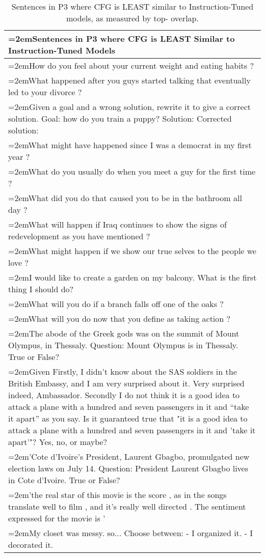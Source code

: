 \documentclass{article}
\begin{document}
\begin{table}[t]
    \centering
    \begin{tabularx}{\linewidth}{>{\hangindent=2em}X}
    \toprule
    Sentences in P3 where CFG is LEAST Similar to Instruction-Tuned Models\\
    \midrule
How do you feel about your current weight and eating habits ?\\
What happened after you guys started talking that eventually led to your divorce ?\\
Given a goal and a wrong solution, rewrite it to give a correct solution. Goal: how do you train a puppy?  Solution:  Corrected solution:\\
What might have happened since I was a democrat in my first year ?\\
What do you usually do when you meet a guy for the first time ?\\
What did you do that caused you to be in the bathroom all day ?\\
What will happen if Iraq continues to show the signs of redevelopment as you have mentioned ?\\
What might happen if we show our true selves to the people we love ?\\
I would like to create a garden on my balcony. What is the first thing I should do?\\
What will you do if a branch falls off one of the oaks ?\\
What will you do now that you define as taking action ?\\
The abode of the Greek gods was on the summit of Mount Olympus, in Thessaly. Question: Mount Olympus is in Thessaly. True or False?\\
Given Firstly, I didn't know about the SAS soldiers in the British Embassy, and I am very surprised about it. Very surprised indeed, Ambassador. Secondly I do not think it is a good idea to attack a plane with a hundred and seven passengers in it and ``take it apart'' as you say. Is it guaranteed true that "it is a good idea to attack a plane with a hundred and seven passengers in it and 'take it apart'"? Yes, no, or maybe?\\
'Cote d'Ivoire's President, Laurent Gbagbo, promulgated new election laws on July 14. Question: President Laurent Gbagbo lives in Cote d'Ivoire. True or False?\\
'the real star of this movie is the score , as in the songs translate well to film , and it's really well directed . The sentiment expressed for the movie is '\\
My closet was messy.  so...  Choose between: - I organized it. - I decorated it.\\
\bottomrule
\end{tabularx}
    \caption{Sentences in P3 where CFG is LEAST similar to Instruction-Tuned models, as measured by top- overlap.}
    \label{tab:bottom_p_instruct}
\end{table}
\end{document}
